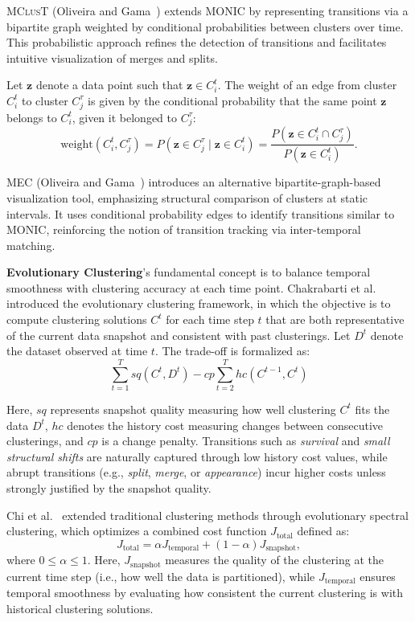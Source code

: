 \textsc{MClusT} (Oliveira and Gama~\cite{mclust}) extends MONIC by representing transitions via a
bipartite graph weighted by conditional probabilities between clusters over time.
This probabilistic approach refines the detection of transitions and facilitates intuitive
visualization of merges and splits.

Let $ \mathbf{z} $ denote a data point such that $ \mathbf{z} \in C_i^t $. The
weight of an edge from cluster $ C_i^t $ to cluster $ C_j^{\tau} $ is given by
the conditional probability that the same point $ \mathbf{z} $ belongs to $
    C_i^t $, given it belonged to $ C_j^{\tau} $:
\begin{equation}
    \text{weight}(C_i^t, C_j^{\tau}) = P(\mathbf{z} \in C_j^{\tau} \mid \mathbf{z} \in C_i^t) =
    \frac{P(\mathbf{z} \in C_i^t \cap C_j^{\tau})}{P(\mathbf{z} \in C_i^t)}.
\end{equation}

\textsc{MEC} (Oliveira and Gama~\cite{mec}) introduces an alternative bipartite-graph-based visualization
tool, emphasizing structural comparison of clusters at static intervals. It uses conditional
probability edges to identify transitions similar to MONIC, reinforcing the notion of transition
tracking via inter-temporal matching.

\textbf{Evolutionary Clustering}'s fundamental concept is to balance temporal smoothness
with clustering accuracy at each time point. Chakrabarti et al.~\cite{evolutionary_clustering}
introduced the evolutionary clustering framework, in which the objective is to compute clustering
solutions $ C^t $ for each time step $ t $ that are both representative of the current data snapshot
and consistent with past clusterings. Let $ D^t $ denote the dataset observed at time $ t $.
The trade-off is formalized as:
\begin{equation}
    \sum_{t=1}^T sq(C^t, D^t) - cp \sum_{t=2}^T hc(C^{t-1}, C^t)
\end{equation}

Here, $ sq $ represents snapshot quality measuring how well clustering $ C^t $
fits the data $ D^t $, $ hc $ denotes the history cost measuring changes
between consecutive clusterings, and $ cp $ is a change penalty. Transitions
such as \emph{survival} and \emph{small structural shifts} are naturally
captured through low history cost values, while abrupt transitions (e.g.,
\emph{split}, \emph{merge}, or \emph{appearance}) incur higher costs unless
strongly justified by the snapshot quality.

Chi et al.~\cite{spectral_evolutionary_clustering} extended traditional
clustering methods through evolutionary spectral clustering, which optimizes a
combined cost function $J_{\text{total}}$ defined as:
\begin{equation}
    J_{\text{total}} = \alpha J_{\text{temporal}} + (1 - \alpha) J_{\text{snapshot}},
\end{equation}
where $0 \leq \alpha \leq 1$. Here, $J_{\text{snapshot}}$ measures the quality
of the clustering at the current time step (i.e., how well the data is partitioned),
while $J_{\text{temporal}}$ ensures temporal smoothness by evaluating how
consistent the current clustering is with historical clustering solutions.

